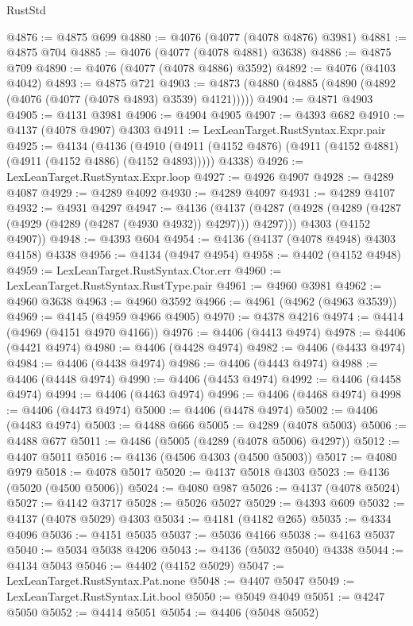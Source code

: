 \begin{lexlean}{RustStd}
\begin{coremodule}
@4876 := @4875 @699
@4880 := @4076 (@4077 (@4078 @4876) @3981)
@4881 := @4875 @704
@4885 := @4076 (@4077 (@4078 @4881) @3638)
@4886 := @4875 @709
@4890 := @4076 (@4077 (@4078 @4886) @3592)
@4892 := @4076 (@4103 @4042)
@4893 := @4875 @721
@4903 := @4873 (@4880 (@4885 (@4890 (@4892 (@4076 (@4077 (@4078 @4893) @3539) @4121)))))
@4904 := @4871 @4903
@4905 := @4131 @3981
@4906 := @4904 @4905
@4907 := @4393 @682
@4910 := @4137 (@4078 @4907) @4303
@4911 := LexLeanTarget.RustSyntax.Expr.pair
@4925 := @4134
    (@4136
      (@4910 (@4911 (@4152 @4876) (@4911 (@4152 @4881) (@4911 (@4152 @4886) (@4152 @4893)))))
      @4338)
@4926 := LexLeanTarget.RustSyntax.Expr.loop
@4927 := @4926 @4907
@4928 := @4289 @4087
@4929 := @4289 @4092
@4930 := @4289 @4097
@4931 := @4289 @4107
@4932 := @4931 @4297
@4947 := @4136
    (@4137
      (@4287 (@4928 (@4289 (@4287 (@4929 (@4289 (@4287 (@4930 @4932)) @4297))) @4297)))
      @4303
      (@4152 @4907))
@4948 := @4393 @604
@4954 := @4136 (@4137 (@4078 @4948) @4303 @4158) @4338
@4956 := @4134 (@4947 @4954)
@4958 := @4402 (@4152 @4948)
@4959 := LexLeanTarget.RustSyntax.Ctor.err
@4960 := LexLeanTarget.RustSyntax.RustType.pair
@4961 := @4960 @3981
@4962 := @4960 @3638
@4963 := @4960 @3592
@4966 := @4961 (@4962 (@4963 @3539))
@4969 := @4145 (@4959 @4966 @4905)
@4970 := @4378 @4216
@4974 := @4414 (@4969 (@4151 @4970 @4166))
@4976 := @4406 (@4413 @4974)
@4978 := @4406 (@4421 @4974)
@4980 := @4406 (@4428 @4974)
@4982 := @4406 (@4433 @4974)
@4984 := @4406 (@4438 @4974)
@4986 := @4406 (@4443 @4974)
@4988 := @4406 (@4448 @4974)
@4990 := @4406 (@4453 @4974)
@4992 := @4406 (@4458 @4974)
@4994 := @4406 (@4463 @4974)
@4996 := @4406 (@4468 @4974)
@4998 := @4406 (@4473 @4974)
@5000 := @4406 (@4478 @4974)
@5002 := @4406 (@4483 @4974)
@5003 := @4488 @666
@5005 := @4289 (@4078 @5003)
@5006 := @4488 @677
@5011 := @4486 (@5005 (@4289 (@4078 @5006) @4297))
@5012 := @4407 @5011
@5016 := @4136 (@4506 @4303 (@4500 @5003))
@5017 := @4080 @979
@5018 := @4078 @5017
@5020 := @4137 @5018 @4303
@5023 := @4136 (@5020 (@4500 @5006))
@5024 := @4080 @987
@5026 := @4137 (@4078 @5024)
@5027 := @4142 @3717
@5028 := @5026 @5027
@5029 := @4393 @609
@5032 := @4137 (@4078 @5029) @4303
@5034 := @4181 (@4182 @265)
@5035 := @4334 @4096
@5036 := @4151 @5035
@5037 := @5036 @4166
@5038 := @4163 @5037
@5040 := @5034 @5038 @4206
@5043 := @4136 (@5032 @5040) @4338
@5044 := @4134 @5043
@5046 := @4402 (@4152 @5029)
@5047 := LexLeanTarget.RustSyntax.Pat.none
@5048 := @4407 @5047
@5049 := LexLeanTarget.RustSyntax.Lit.bool
@5050 := @5049 @4049
@5051 := @4247 @5050
@5052 := @4414 @5051
@5054 := @4406 (@5048 @5052)

\end{coremodule}
\end{lexlean}
